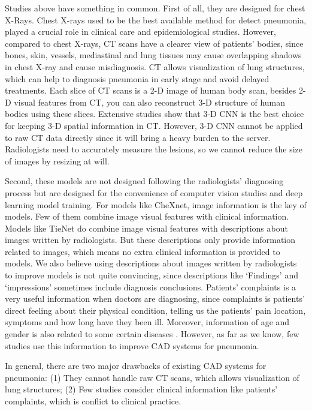 Studies above have something in common. First of all, they are designed for chest X-Rays. Chest X-rays used to be the best available method for detect pneumonia, played a crucial role in clinical care\cite{Franquet2001Imaging} and epidemiological studies\cite{Thomas2005Standardized}. However, compared to chest X-rays, CT scans have a clearer view of patients' bodies, since bones, skin, vessels, mediastinal and lung tissues may cause overlapping shadows in chest X-ray and cause misdiagnosis. CT allows visualization of lung structures\cite{korfiatis2009texture}, which can help to diagnosis pneumonia in early stage and avoid delayed treatments.
Each slice of CT scans is a 2-D image of human body scan, besides 2-D visual features from CT, you can also reconstruct 3-D structure of human bodies using these slices. Extensive studies show that 3-D CNN is the best choice for keeping 3-D spatial information in CT\cite{Yorozu1987Electron}. However, 3-D CNN cannot be applied to raw CT data directly since it will bring a heavy burden to the server. Radiologists need to accurately measure the lesions, so we cannot reduce the size of images by resizing at will.
 
Second, these models are not designed following the radiologists' diagnosing process but are designed for the convenience of computer vision studies and deep learning model training. For models like CheXnet, image information is the key of models. Few of them combine image visual features with clinical information. Models like TieNet do combine image visual features with descriptions about images written by radiologists. But these descriptions only provide information related to images, which means no extra clinical information is provided to models. We also believe using descriptions about images written by radiologists to improve models is not quite convincing, since descriptions like `Findings' and `impressions' sometimes include diagnosis conclusions.
Patients' complaints is a very useful information when doctors are diagnosing, since complaints is patients' direct feeling about their physical condition, telling us the patients' pain location, symptoms and how long have they been ill. Moreover, information of age and gender is also related to some certain diseases\cite{xiaojian2011analysis} \cite{huang2014design}. However, as far as we know, few studies use this information to improve CAD systems for pneumonia. 

In general, there are two major drawbacks of existing CAD systems for pneumonia: (1) They cannot handle raw CT scans, which allows visualization of lung structures; (2) Few studies consider clinical information like patients' complaints, which is conflict to clinical practice.

